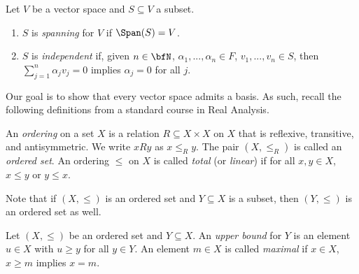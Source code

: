     \begin{definition}
        Let $V$ be a vector space and $S \subseteq V$ a subset.
            \begin{enumerate}[label = (\arabic*),itemsep=1pt,topsep=3pt]
                \item $S$ is \textit{spanning} for $V$ if $\Span(S) = V$.
                \item $S$ is \textit{independent} if, given $n \in \bfN$, $\alpha_1,...,\alpha_n \in F$, $v_1,...,v_n \in S$, then $\sum_{j = 1}^n \alpha_j v_j = 0$ implies $\alpha_j = 0$ for all $j$.
            \end{enumerate}
    \end{definition}

    \iffalse
    \begin{center}
        \begin{tikzpicture}
            \draw[thick] (0.3,0) -- (2.3,0);
            \node at (2.33, 0) {$/\,$};
            \node at (2.62, 0) {$/\,$};
            \draw[thick] (2.6,0) -- (4.6,0);
        \end{tikzpicture}
    \end{center}
    \fi

    \vspace{25pt}

    Our goal is to show that every vector space admits a basis. As such, recall the following definitions from a standard course in Real Analysis.

    \begin{definition}
        An \textit{ordering} on a set $X$ is a relation $R \subseteq X \times X$ on $X$ that is reflexive, transitive, and antisymmetric. We write $xRy$ as $x \leq_R y$. The pair $(X,\leq_R)$ is called an \textit{ordered set}. An ordering $\leq$ on $X$ is called \textit{total} (or \textit{linear}) if for all $x,y \in X$, $x \leq y$ or $y \leq x$.
    \end{definition}

    Note that if $(X,\leq)$ is an ordered set and $Y \subseteq X$ is a subset, then $(Y,\leq)$ is an ordered set as well.

    \begin{definition}
        Let $(X, \leq)$ be an ordered set and $Y \subseteq X$. An \textit{upper bound} for $Y$ is an element $u \in X$ with $u \geq y$ for all $y \in Y$. An element $m \in X$ is called \textit{maximal} if $x \in X$, $x \geq m$ implies $x = m$.
    \end{definition}

